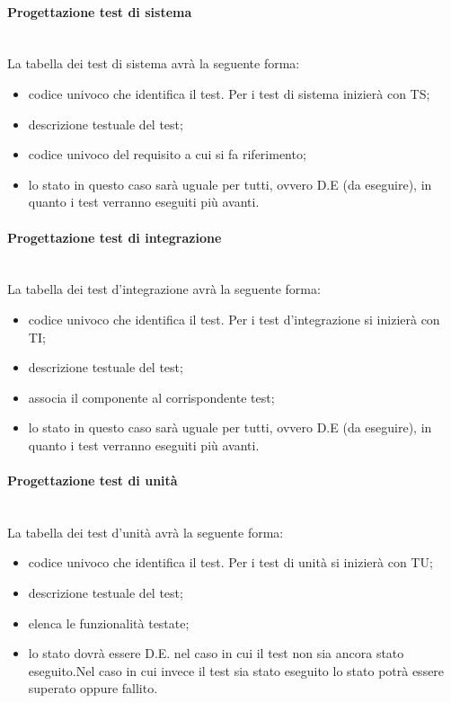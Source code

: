 \paragraph{Progettazione test di sistema} \hfill \\
La tabella dei test di sistema avrà la seguente forma:
\begin{itemize}
\item {}codice univoco che identifica il test. Per i test di sistema inizierà con TS;
\item {} descrizione testuale del test;
\item {}codice univoco del requisito a cui si fa riferimento;
\item {}lo stato in questo caso sarà uguale per tutti, ovvero D.E (da eseguire), in quanto i test verranno eseguiti più avanti.
\end{itemize}


\paragraph{Progettazione test di integrazione} \hfill \\
La tabella dei test d'integrazione avrà la seguente forma:
\begin{itemize}
\item {}codice univoco che identifica il test. Per i test d'integrazione si inizierà con TI;
\item {} descrizione testuale del test;
\item {} associa il componente al corrispondente test;
\item {}lo stato in questo caso sarà uguale per tutti, ovvero D.E (da eseguire), in quanto i test verranno eseguiti più avanti.
\end{itemize}

\paragraph{Progettazione test di unità} \hfill \\
La tabella dei test d'unità avrà la seguente forma:
\begin{itemize}
\item {}codice univoco che identifica il test. Per i test di unità si inizierà con TU;
\item {} descrizione testuale del test;
\item {} elenca le funzionalità testate;
\item {}lo stato dovrà essere D.E. nel caso in cui il test non sia ancora stato eseguito.Nel caso in cui invece il test sia stato eseguito lo stato potrà essere superato oppure fallito.
\end{itemize}

